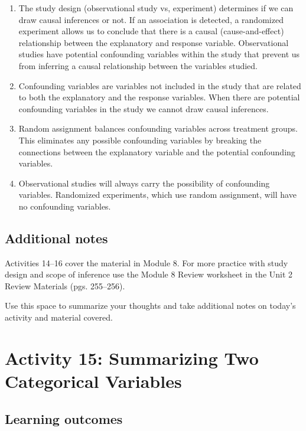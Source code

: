 \documentclass[
]{report}
\begin{document}
\begin{enumerate}
\def\labelenumi{\arabic{enumi}.}
\item
  The study design (observational study vs, experiment) determines if we can draw causal inferences or not. If an association is detected, a randomized experiment allows us to conclude that there is a causal (cause-and-effect) relationship between the explanatory and response variable. Observational studies have potential confounding variables within the study that prevent us from inferring a causal relationship between the variables studied.
\item
  Confounding variables are variables not included in the study that are related to both the explanatory and the response variables. When there are potential confounding variables in the study we cannot draw causal inferences.
\item
  Random assignment balances confounding variables across treatment groups. This eliminates any possible confounding variables by breaking the connections between the explanatory variable and the potential confounding variables.
\item
  Observational studies will always carry the possibility of confounding variables. Randomized experiments, which use random assignment, will have no confounding variables.
\end{enumerate}

\subsection{Additional notes}\label{additional-notes-13}

Activities 14--16 cover the material in Module 8. For more practice with study design and scope of inference use the Module 8 Review worksheet in the Unit 2 Review Materials (pgs. 255--256).

Use this space to summarize your thoughts and take additional notes on today's activity and material covered.

\newpage

\section{Activity 15: Summarizing Two Categorical Variables}\label{activity-15-summarizing-two-categorical-variables}


\subsection{Learning outcomes}\label{learning-outcomes-16}
\end{document}
